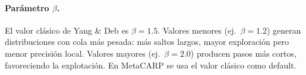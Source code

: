 \documentclass[12pt, a4paper]{article}
\begin{document}
\paragraph{Parámetro $\beta$.}
El valor clásico de Yang \& Deb es $\beta = 1.5$. Valores menores (ej.\ $\beta =
1.2$) generan distribuciones con cola más pesada: más saltos largos, mayor
exploración pero menor precisión local. Valores mayores (ej.\ $\beta = 2.0$)
producen pasos más cortos, favoreciendo la explotación. En MetaCARP se usa el
valor clásico como default.
\end{document}
